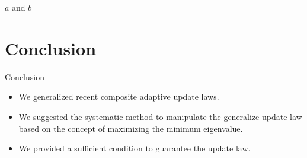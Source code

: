 \documentclass[handout]{beamer}
\theoremstyle{plain}
\theoremstyle{definition}
\theoremstyle{remark}
\begin{document}
\begin{frame}{$a$ and $b$}
\end{frame}


\section{Conclusion}

\begin{frame}{Conclusion}
	\begin{itemize}
		\item We generalized recent composite adaptive update laws.
		\item We suggested the systematic method to manipulate the generalize
			update law based on the concept of maximizing the minimum eigenvalue.
		\item We provided a sufficient condition to guarantee the update law.
	\end{itemize}
\end{frame}
\end{document}
